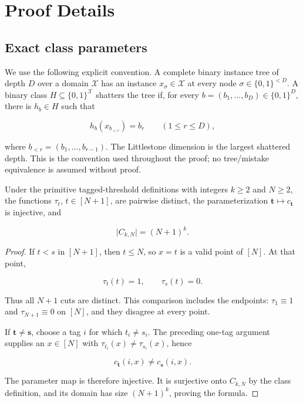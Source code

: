 \appendix

\section{Proof Details}\label{sec:proof-details}

\subsection{Exact class parameters}\label{app:step-001}
We use the following explicit convention. A complete binary instance tree of depth \(D\) over a domain \(\mathcal X\) has an instance \(x_\sigma\in\mathcal X\) at every node \(\sigma\in\{0,1\}^{<D}\). A binary class \(H\subseteq\{0,1\}^{\mathcal X}\) shatters the tree if, for every \(b=(b_1,\ldots,b_D)\in\{0,1\}^D\), there is \(h_b\in H\) such that

\[
h_b(x_{b_{<r}})=b_r\qquad(1\le r\le D),
\]

where \(b_{<r}=(b_1,\ldots,b_{r-1})\). The Littlestone dimension is the largest shattered depth. This is the convention used throughout the proof; no tree/mistake equivalence is assumed without proof.

\begin{lemma}\label{lem:step-001-cardinality}
Under the primitive tagged-threshold definitions with integers \(k\ge2\) and \(N\ge2\), the functions \(\tau_t\), \(t\in[N+1]\), are pairwise distinct, the parameterization \(\boldsymbol t\mapsto c_{\boldsymbol t}\) is injective, and

\[
\lvert C_{k,N}\rvert=(N+1)^k.
\]
\end{lemma}

\begin{proof}
If \(t<s\) in \([N+1]\), then \(t\le N\), so \(x=t\) is a valid point of \([N]\). At that point,

\[
\tau_t(t)=1,\qquad \tau_s(t)=0.
\]

Thus all \(N+1\) cuts are distinct. This comparison includes the endpoints: \(\tau_1\equiv1\) and \(\tau_{N+1}\equiv0\) on \([N]\), and they disagree at every point.

If \(\boldsymbol t\ne\boldsymbol s\), choose a tag \(i\) for which \(t_i\ne s_i\). The preceding one-tag argument supplies an \(x\in[N]\) with \(\tau_{t_i}(x)\ne\tau_{s_i}(x)\), hence

\[
c_{\boldsymbol t}(i,x)\ne c_{\boldsymbol s}(i,x).
\]

The parameter map is therefore injective. It is surjective onto \(C_{k,N}\) by the class definition, and its domain has size \((N+1)^k\), proving the formula. \end{proof}

